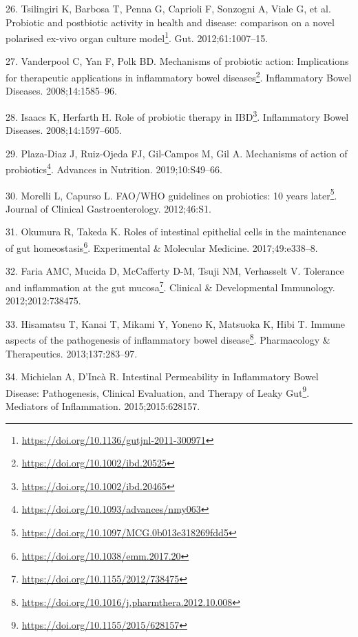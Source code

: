 \documentclass[
  a4paper,
]{book}
\DeclareRobustCommand{\href}[2]{#2\footnote{\url{#1}}}
\newlength{\cslhangindent}
\newlength{\cslentryspacingunit} %
\newenvironment{CSLReferences}[2] %
 {%
  \setlength{\parindent}{0pt}
  \ifodd #1
  \let\oldpar\par
  \def\par{\hangindent=\cslhangindent\oldpar}
  \fi
  \setlength{\parskip}{#2\cslentryspacingunit}
 }%
 {}
\begin{document}
\begin{CSLReferences}{0}{0}
\leavevmode{}%
26. Tsilingiri K, Barbosa T, Penna G, Caprioli F, Sonzogni A, Viale G, et al. \href{https://doi.org/10.1136/gutjnl-2011-300971}{Probiotic and postbiotic activity in health and disease: comparison on a novel polarised ex-vivo organ culture model}. Gut. 2012;61:1007--15.

\leavevmode{}%
27. Vanderpool C, Yan F, Polk BD. \href{https://doi.org/10.1002/ibd.20525}{Mechanisms of probiotic action: Implications for therapeutic applications in inflammatory bowel diseases}. Inflammatory Bowel Diseases. 2008;14:1585--96.

\leavevmode{}%
28. Isaacs K, Herfarth H. \href{https://doi.org/10.1002/ibd.20465}{Role of probiotic therapy in IBD}. Inflammatory Bowel Diseases. 2008;14:1597--605.

\leavevmode{}%
29. Plaza-Diaz J, Ruiz-Ojeda FJ, Gil-Campos M, Gil A. \href{https://doi.org/10.1093/advances/nmy063}{Mechanisms of action of probiotics}. Advances in Nutrition. 2019;10:S49--66.

\leavevmode{}%
30. Morelli L, Capurso L. \href{https://doi.org/10.1097/MCG.0b013e318269fdd5}{FAO/WHO guidelines on probiotics: 10 years later}. Journal of Clinical Gastroenterology. 2012;46:S1.

\leavevmode{}%
31. Okumura R, Takeda K. \href{https://doi.org/10.1038/emm.2017.20}{Roles of intestinal epithelial cells in the maintenance of gut homeostasis}. Experimental \& Molecular Medicine. 2017;49:e338--8.

\leavevmode{}%
32. Faria AMC, Mucida D, McCafferty D-M, Tsuji NM, Verhasselt V. \href{https://doi.org/10.1155/2012/738475}{Tolerance and inflammation at the gut mucosa}. Clinical \& Developmental Immunology. 2012;2012:738475.

\leavevmode{}%
33. Hisamatsu T, Kanai T, Mikami Y, Yoneno K, Matsuoka K, Hibi T. \href{https://doi.org/10.1016/j.pharmthera.2012.10.008}{Immune aspects of the pathogenesis of inflammatory bowel disease}. Pharmacology \& Therapeutics. 2013;137:283--97.

\leavevmode{}%
34. Michielan A, D'Incà R. \href{https://doi.org/10.1155/2015/628157}{Intestinal Permeability in Inflammatory Bowel Disease: Pathogenesis, Clinical Evaluation, and Therapy of Leaky Gut}. Mediators of Inflammation. 2015;2015:628157.


\end{CSLReferences}
\end{document}
